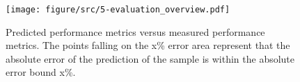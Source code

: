 \begin{figure}[htb]
  \centering
  \texttt{[image: figure/src/5-evaluation\_overview.pdf]}
  \caption{Predicted performance metrics versus measured performance metrics. 
    The points falling on the x\% error area represent that the absolute error of the prediction of the sample is within the absolute error bound x\%.
    }
  \label{fig:evaluation overview}
\end{figure}
